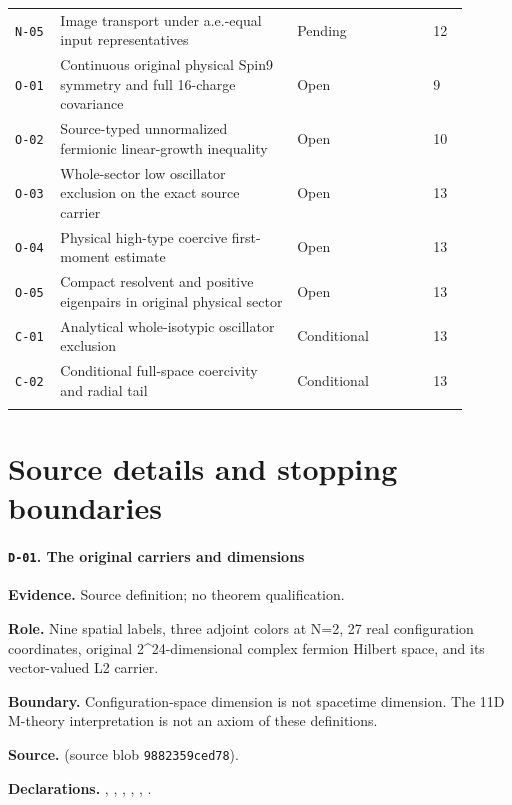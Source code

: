 \begin{longtable}{@{}p{0.09\linewidth}p{0.47\linewidth}p{0.27\linewidth}p{0.07\linewidth}@{}}
\addlinespace[0.15em]
\texttt{N-05} & Image transport under a.e.-equal input representatives & Pending & 12 \\
\addlinespace[0.15em]
\texttt{O-01} & Continuous original physical Spin9 symmetry and full 16-charge covariance & Open & 9 \\
\addlinespace[0.15em]
\texttt{O-02} & Source-typed unnormalized fermionic linear-growth inequality & Open & 10 \\
\addlinespace[0.15em]
\texttt{O-03} & Whole-sector low oscillator exclusion on the exact source carrier & Open & 13 \\
\addlinespace[0.15em]
\texttt{O-04} & Physical high-type coercive first-moment estimate & Open & 13 \\
\addlinespace[0.15em]
\texttt{O-05} & Compact resolvent and positive eigenpairs in original physical sector & Open & 13 \\
\addlinespace[0.15em]
\texttt{C-01} & Analytical whole-isotypic oscillator exclusion & Conditional & 13 \\
\addlinespace[0.15em]
\texttt{C-02} & Conditional full-space coercivity and radial tail & Conditional & 13 \\
\addlinespace[0.15em]
\bottomrule\end{longtable}
\endgroup
\section{Source details and stopping boundaries}
\begingroup\small\sloppy
\paragraph{\texttt{D-01}. The original carriers and dimensions}
\noindent\textbf{Evidence.} Source definition; no theorem qualification.
\par\noindent\textbf{Role.} Nine spatial labels, three adjoint colors at N=2, 27 real configuration coordinates, original 2\textasciicircum{}24-dimensional complex fermion Hilbert space, and its vector-valued L2 carrier.
\par\noindent\textbf{Boundary.} Configuration-space dimension is not spacetime dimension. The 11D M-theory interpretation is not an axiom of these definitions.
\par\noindent\textbf{Source.}  (source blob \texttt{9882359ced78}).
\par\noindent\textbf{Declarations.} , , , , , .
\medskip

